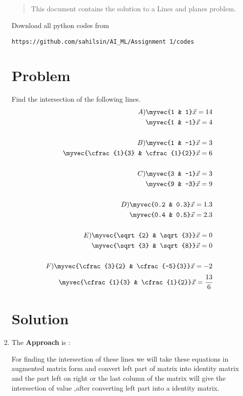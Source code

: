 \begin{enumerate}[label=\thesection.\arabic*.,ref=\thesection.\theenumi]

\begin{abstract}
This document contains the solution to a Lines and planes problem.
\end{abstract}
Download all python codes from 
%
\begin{lstlisting}
https://github.com/sahilsin/AI_ML/Assignment 1/codes
\end{lstlisting}

\section{Problem}
Find the intersection of the following lines.
\begin{align*}
A)
    \myvec{1  &  1}\vec{x}=14
\\
    \myvec{1 & -1}\vec{x}=4
\\ \\
B)
    \myvec{1  &  -1}\vec{x}=3
\\
    \myvec{\cfrac{1}{3} & \cfrac{1}{2}}\vec{x}=6
\\ \\
C)
    \myvec{3  &  -1}\vec{x}=3
\\
    \myvec{9 & -3}\vec{x}=9
\\ \\
D)
    \myvec{0.2  &  0.3}\vec{x}=1.3
\\
    \myvec{0.4 & 0.5}\vec{x}=2.3
\\ \\
E)
    \myvec{\sqrt{2}  &  \sqrt{3}}\vec{x}=0
\\
    \myvec{\sqrt{3} & \sqrt{8}}\vec{x}=0
\\ \\
F)
    \myvec{\cfrac{3}{2}  &  \cfrac{-5}{3}}\vec{x}=-2
\\
    \myvec{\cfrac{1}{3} & \cfrac{1}{2}}\vec{x}=\cfrac{13}{6}
\end{align*}


\section{Solution}

\item The \textbf{Approach} is :

\begin{flushleft}
    For finding the intersection of these lines we will take these equations in augmented matrix form and convert left part of matrix into identity matrix and the part left on right or the last column of the matrix will give the intersection of value ,after converting left part into a identity matrix.\\
\end{flushleft}


\end{enumerate}
